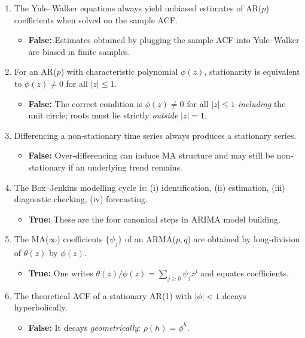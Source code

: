 \documentclass[11pt]{article}
\begin{document}
\begin{enumerate}
  \item The Yule–Walker equations always yield unbiased estimates of AR($p$) coefficients when solved on the sample ACF.
  \begin{itemize}
    \item \textbf{False:}  Estimates obtained by plugging the sample ACF into Yule–Walker are biased in finite samples.
  \end{itemize}

  \item For an AR($p$) with characteristic polynomial $\phi(z)$, stationarity is equivalent to $\phi(z)\neq0$ for all $|z|\le1$.
  \begin{itemize}
    \item \textbf{False:} The correct condition is $\phi(z)\neq0$ for all $|z|\le1$ \emph{including} the unit circle; roots must lie strictly \emph{outside} $|z|=1$.
  \end{itemize}

  \item Differencing a non‐stationary time series always produces a stationary series.
  \begin{itemize}
    \item \textbf{False:} Over‐differencing can induce MA structure and may still be non‐stationary if an underlying trend remains.
  \end{itemize}

  \item The Box–Jenkins modelling cycle is: (i) identification, (ii) estimation, (iii) diagnostic checking, (iv) forecasting.
  \begin{itemize}
    \item \textbf{True:}  These are the four canonical steps in ARIMA model building.
  \end{itemize}

  \item The MA($\infty$) coefficients $\{\psi_j\}$ of an ARMA($p,q$) are obtained by long‐division of $\theta(z)$ by $\phi(z)$.
  \begin{itemize}
    \item \textbf{True:}  One writes $\theta(z)/\phi(z)=\sum_{j\ge0}\psi_j z^j$ and equates coefficients.
  \end{itemize}

  \item The theoretical ACF of a stationary AR(1) with $|\phi|<1$ decays hyperbolically.
  \begin{itemize}
    \item \textbf{False:}  It decays \emph{geometrically}: $\rho(h)=\phi^h$.
  \end{itemize}


\end{enumerate}
\end{document}
